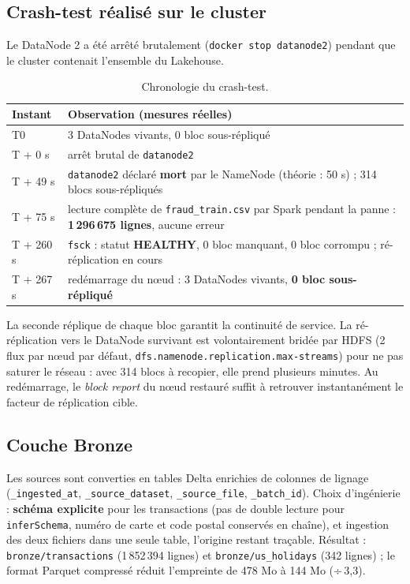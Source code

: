 \documentclass[11pt,a4paper]{article}
\newcommand{\code}[1]{\texttt{\small #1}}
\begin{document}
\subsection{Crash-test réalisé sur le cluster}\label{sec:crash}
Le DataNode 2 a été arrêté brutalement (\code{docker stop datanode2}) pendant que le cluster contenait l'ensemble du Lakehouse.

\begin{table}[H]
\centering\small
\begin{tabularx}{\linewidth}{@{}l Y@{}}
\toprule
\textbf{Instant} & \textbf{Observation (mesures réelles)} \\ \midrule
T0 & 3 DataNodes vivants, 0 bloc sous-répliqué \\
T + 0 s & arrêt brutal de \code{datanode2} \\
T + 49 s & \code{datanode2} déclaré \textbf{mort} par le NameNode (théorie : 50 s) ; 314 blocs sous-répliqués \\
T + 75 s & lecture complète de \code{fraud\_train.csv} par Spark pendant la panne : \textbf{1\,296\,675 lignes}, aucune erreur \\
T + 260 s & \code{fsck} : statut \textbf{HEALTHY}, 0 bloc manquant, 0 bloc corrompu ; ré-réplication en cours \\
T + 267 s & redémarrage du nœud : 3 DataNodes vivants, \textbf{0 bloc sous-répliqué} \\
\bottomrule
\end{tabularx}
\caption{Chronologie du crash-test.}
\end{table}

\begin{keybox}[Analyse]
La seconde réplique de chaque bloc garantit la continuité de service. La ré-réplication vers le DataNode survivant est
volontairement bridée par HDFS (2 flux par nœud par défaut, \code{dfs.namenode.replication.max-streams}) pour ne pas saturer le
réseau : avec 314 blocs à recopier, elle prend plusieurs minutes. Au redémarrage, le \emph{block report} du nœud restauré suffit à
retrouver instantanément le facteur de réplication cible.
\end{keybox}

\subsection{Couche Bronze}
Les sources sont converties en tables Delta enrichies de colonnes de lignage (\code{\_ingested\_at}, \code{\_source\_dataset},
\code{\_source\_file}, \code{\_batch\_id}). Choix d'ingénierie : \textbf{schéma explicite} pour les transactions (pas de double
lecture pour \code{inferSchema}, numéro de carte et code postal conservés en chaîne), et ingestion des deux fichiers dans une seule
table, l'origine restant traçable. Résultat : \code{bronze/transactions} (1\,852\,394 lignes) et \code{bronze/us\_holidays}
(342 lignes) ; le format Parquet compressé réduit l'empreinte de 478 Mo à 144 Mo (÷\,3,3).
\end{document}
